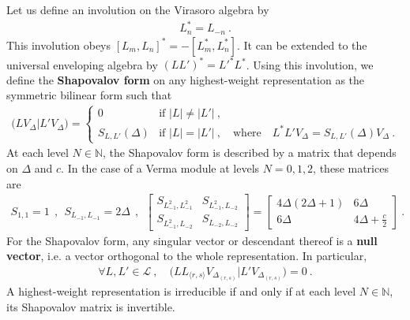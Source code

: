 \documentclass[12pt, a4paper]{article}
\newcommand{\myindex}[1]{\textbf{\boldmath #1}}
\begin{document}
Let us define an involution on the Virasoro algebra by 
\begin{align}
 L^*_n = L_{-n} \ . 
\end{align}
This involution obeys $[L_m,L_n]^* = -[L_m^*,L_n^*]$. It can be extended to the universal enveloping algebra by $\left(LL'\right)^* = L'^*L^*$. Using this involution, we define the \myindex{Shapovalov form} on any highest-weight representation as the symmetric bilinear form such that
\begin{align}
 \big(LV_\Delta\big| L'V_\Delta\big) = \left\{\begin{array}{ll} 0 & \text{if } |L|\neq |L'|\ , 
                                                \\
                                              S_{L,L'}(\Delta) & \text{if } |L|=|L'|\ , \quad \text{where} \quad L^*L'V_\Delta = S_{L,L'}(\Delta) V_\Delta\ .  
                                             \end{array}\right.
\label{shap}
\end{align}
At each level $N\in\mathbb{N}$, the Shapovalov form is described by a matrix that depends on $\Delta$ and $c$. In the case of a Verma module at levels $N=0,1,2$, these matrices are
\begin{align}
 S_{1,1} = 1 \ \  , \ \   S_{L_{-1},L_{-1}} = 2\Delta \ \  , \ \  \begin{bmatrix} S_{L_{-1}^2,L_{-1}^2} & S_{L_{-1}^2,L_{-2}} \\ S_{L_{-1}^2,L_{-2}} & S_{L_{-2},L_{-2}}\end{bmatrix} = 
 \begin{bmatrix} 4\Delta(2\Delta+1) & 6\Delta \\ 6\Delta & 4\Delta+\frac{c}{2}\end{bmatrix}\ .
 \label{sh012}
\end{align}
For the Shapovalov form, any singular vector or descendant thereof is a \myindex{null vector}, i.e. a vector orthogonal to the whole representation. In particular,
\begin{align}
 \forall L, L'\in \mathcal{L}\ , \quad \big(LL_{\langle r,s\rangle} V_{\Delta_{(r,s)}}\big|L' V_{\Delta_{(r,s)}}\big) =0 \ . 
\end{align}
A highest-weight representation is irreducible if and only if at each level $N\in\mathbb{N}$, its Shapovalov matrix is invertible.
\end{document}
